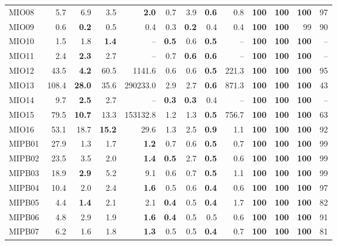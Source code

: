 \begin{table}[!htbp]
{\begin{tabular}{l rrrr | rrrr | rrrr}
MIO08 & 5.7 & 6.9 & 3.5 & \textbf{2.0} & 0.7 & 3.9 & \textbf{0.6} & 0.8 & \textbf{100} & \textbf{100} & \textbf{100} & 97 \\
MIO09 & 0.6 & \textbf{0.2} & 0.5 & 0.4 & 0.3 & \textbf{0.2} & 0.4 & 0.4 & \textbf{100} & \textbf{100} & 99 & 90 \\
MIO10 & 1.5 & 1.8 & \textbf{1.4} & -- & \textbf{0.5} & 0.6 & \textbf{0.5} & -- & \textbf{100} & \textbf{100} & \textbf{100} & -- \\
MIO11 & 2.4 & \textbf{2.3} & 2.7 & -- & 0.7 & \textbf{0.6} & \textbf{0.6} & -- & \textbf{100} & \textbf{100} & \textbf{100} & -- \\
MIO12 & 43.5 & \textbf{4.2} & 60.5 & 1141.6 & 0.6 & 0.6 & \textbf{0.5} & 221.3 & \textbf{100} & \textbf{100} & \textbf{100} & 95 \\
MIO13 & 108.4 & \textbf{28.0} & 35.6 & 290233.0 & 2.9 & 2.7 & \textbf{0.6} & 871.3 & \textbf{100} & \textbf{100} & \textbf{100} & 43 \\
MIO14 & 9.7 & \textbf{2.5} & 2.7 & -- & \textbf{0.3} & \textbf{0.3} & 0.4 & -- & \textbf{100} & \textbf{100} & \textbf{100} & -- \\
MIO15 & 79.5 & \textbf{10.7} & 13.3 & 153132.8 & 1.2 & 1.3 & \textbf{0.5} & 756.7 & \textbf{100} & \textbf{100} & \textbf{100} & 63 \\
MIO16 & 53.1 & 18.7 & \textbf{15.2} & 29.6 & 1.3 & 2.5 & \textbf{0.9} & 1.1 & \textbf{100} & \textbf{100} & \textbf{100} & 92 \\
MIPB01 & 27.9 & 1.3 & 1.7 & \textbf{1.2} & 0.7 & 0.6 & \textbf{0.5} & 0.7 & \textbf{100} & \textbf{100} & \textbf{100} & 99 \\
MIPB02 & 23.5 & 3.5 & 2.0 & \textbf{1.4} & \textbf{0.5} & 2.7 & \textbf{0.5} & 0.6 & \textbf{100} & \textbf{100} & \textbf{100} & 99 \\
MIPB03 & 18.9 & \textbf{2.9} & 5.2 & 9.1 & 0.6 & 0.7 & \textbf{0.5} & 1.1 & \textbf{100} & \textbf{100} & \textbf{100} & 99 \\
MIPB04 & 10.4 & 2.0 & 2.4 & \textbf{1.6} & 0.5 & 0.6 & \textbf{0.4} & 0.6 & \textbf{100} & \textbf{100} & \textbf{100} & 97 \\
MIPB05 & 4.4 & \textbf{1.4} & 2.1 & 2.1 & \textbf{0.4} & 0.5 & \textbf{0.4} & 1.7 & \textbf{100} & \textbf{100} & \textbf{100} & 82 \\
MIPB06 & 4.8 & 2.9 & 1.9 & \textbf{1.6} & \textbf{0.4} & 0.5 & 0.5 & 0.6 & \textbf{100} & \textbf{100} & \textbf{100} & 91 \\
MIPB07 & 6.2 & 1.6 & 1.8 & \textbf{1.3} & 0.5 & 0.5 & \textbf{0.4} & 0.7 & \textbf{100} & \textbf{100} & \textbf{100} & 81 \\

\end{tabular}}
\end{table}
